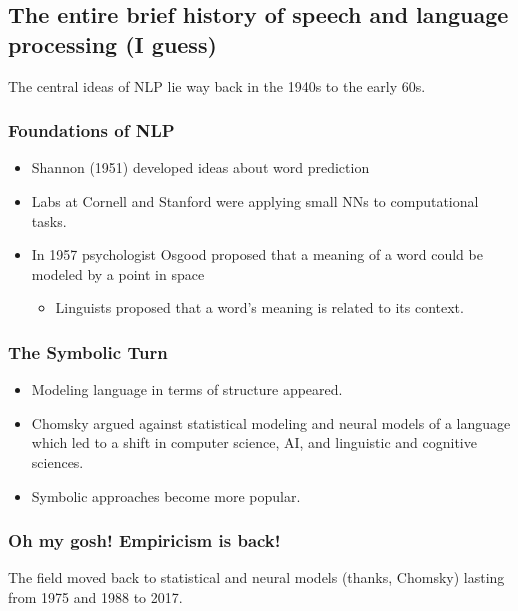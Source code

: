\documentclass[11pt]{article}
\begin{document}
\subsection{The entire brief history of speech and language processing (I
	guess)}

The central ideas of NLP lie way back in the 1940s to the early 60s.

\subsubsection{Foundations of NLP}

\begin{itemize}
	\item Shannon (1951) developed ideas about word prediction
	\item Labs at Cornell and Stanford were applying small NNs to computational
	      tasks.
	\item In 1957 psychologist Osgood proposed that a meaning of a word could be
	      modeled by a point in space
	      \begin{itemize}
		      \item Linguists proposed that a word's meaning is related to its
		            context.
	      \end{itemize}
\end{itemize}

\subsubsection{The Symbolic Turn}

\begin{itemize}
	\item Modeling language in terms of structure appeared.
	\item Chomsky argued against statistical modeling and neural models of a
	      language which led to a shift in computer science, AI, and linguistic
	      and cognitive sciences.
	\item Symbolic approaches become more popular.
\end{itemize}

\subsubsection{Oh my gosh! Empiricism is back!}


The field moved back to statistical and neural models (thanks, Chomsky) lasting
from 1975 and 1988 to 2017.
\end{document}

